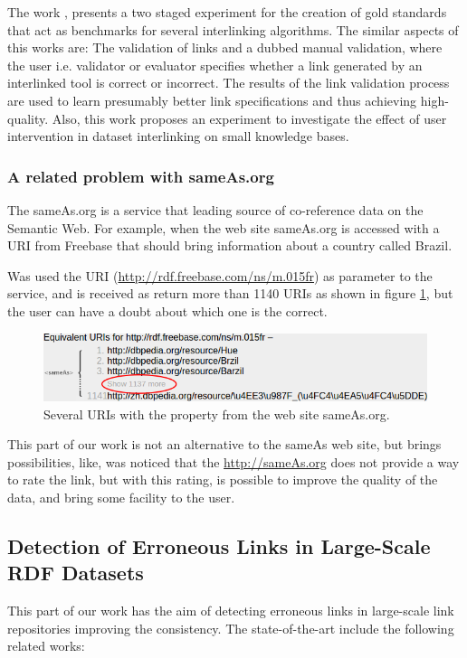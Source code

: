 The work \cite{mofeed2015}, presents a two staged experiment for the creation of gold standards that act as benchmarks for several interlinking algorithms. The similar aspects of this works are: The validation of links and a dubbed manual validation, where the user i.e. validator or evaluator specifies whether a link generated by an interlinked tool is correct or incorrect. The results of the link validation process are used to learn presumably better link specifications and thus achieving high-quality.
Also, this work proposes an experiment to investigate the effect of user intervention in dataset interlinking on small knowledge bases. 

\subsubsection{A related problem with sameAs.org}
The sameAs.org\cite{glaser2009managing} is a service that leading source of co-reference data on the Semantic Web.
For example, when the web site sameAs.org is accessed with a URI from Freebase that should bring information about a country called Brazil.

Was used the URI (\url{http://rdf.freebase.com/ns/m.015fr}) as parameter to the service, and is received as return more than 1140 URIs as shown in figure \ref{fig:sameasorg}, but the user can have a doubt about which one is the correct.

\begin{figure}[hbt] 
  	\centering
	\includegraphics[width=\columnwidth]{img/sameasorg.png}
 	\caption{Several URIs with the property  from the web site sameAs.org.}
  	\label{fig:sameasorg}
\end{figure}

This part of our work\cite{valdestilhas2015dbpediasameas} is not an alternative to the sameAs web site, but brings possibilities, like, was noticed that the \url{http://sameAs.org} does not provide a way to rate the link, but with this rating, is possible to improve the quality of the data, and bring some facility to the user.

\subsection{Detection of Erroneous Links in Large-Scale RDF Datasets}
This part of our work\cite{valdestilhas2017cedal} has the aim of detecting erroneous links in large-scale link repositories improving the consistency. The state-of-the-art include the following related works:

